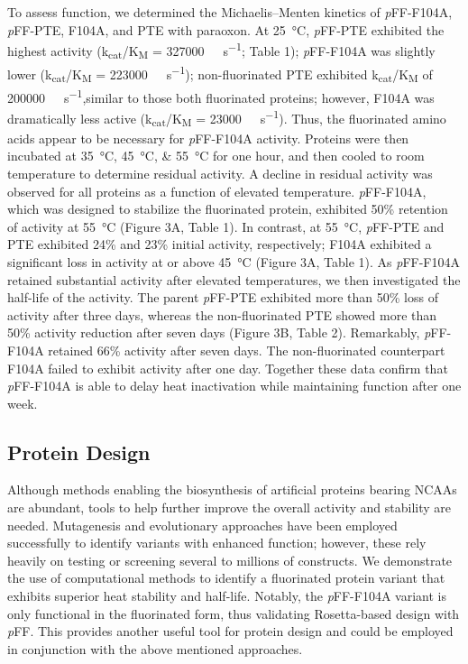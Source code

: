 \begin{refsection}
To assess function, we determined the Michaelis–Menten kinetics of
\emph{p}FF-F104A, \emph{p}FF-PTE, F104A, and PTE with paraoxon. At
\SI{25}{\celsius}, \emph{p}FF-PTE exhibited the highest activity
(k\textsubscript{cat}/K\textsubscript{M} = \SI{327000}{\per\Molar\per\second};
Table 1); \emph{p}FF-F104A was slightly lower
(k\textsubscript{cat}/K\textsubscript{M} = \SI{223000}{\per\Molar\per\second});
non-fluorinated PTE exhibited k\textsubscript{cat}/K\textsubscript{M} of
\SI{200000}{\per\Molar\per\second},similar to those both fluorinated proteins;
however, F104A was dramatically less active
(k\textsubscript{cat}/K\textsubscript{M} = \SI{23000}{\per\Molar\per\second}).
Thus, the fluorinated amino acids appear to be necessary for \emph{p}FF-F104A
activity.  Proteins were then incubated at \SIlist{35;45;55}{\celsius} for one
hour, and then cooled to room temperature to determine residual activity. A
decline in residual activity was observed for all proteins as a function of
elevated temperature. \emph{p}FF-F104A, which was designed to stabilize the
fluorinated protein, exhibited 50\% retention of activity at \SI{55}{\celsius}
(Figure 3A, Table 1). In contrast, at \SI{55}{\celsius}, \emph{p}FF-PTE and PTE
exhibited 24\% and 23\% initial activity, respectively; F104A exhibited a
significant loss in activity at or above \SI{45}{\celsius} (Figure 3A, Table
1). As \emph{p}FF-F104A retained substantial activity after elevated
temperatures, we then investigated the half-life of the activity. The parent
\emph{p}FF-PTE exhibited more than 50\% loss of activity after three days,
whereas the non-fluorinated PTE showed more than 50\% activity reduction after
seven days (Figure 3B, Table 2). Remarkably, \emph{p}FF-F104A retained 66\%
activity after seven days. The non-fluorinated counterpart F104A failed to
exhibit activity after one day. Together these data confirm that
\emph{p}FF-F104A is able to delay heat inactivation while maintaining function
after one week.

\subsection{Protein Design}

Although methods enabling the biosynthesis of artificial proteins bearing NCAAs
are abundant,\cite{Voloshchuk2009} tools to help further improve the overall
activity and stability are needed. Mutagenesis and evolutionary approaches have
been employed successfully to identify variants with enhanced function;
however, these rely heavily on testing or screening several to millions of
constructs.\cite{Voloshchuk2007b,Montclare2006b,Yoo2007} We demonstrate the use
of computational methods to identify a fluorinated protein variant that
exhibits superior heat stability and half-life. Notably, the \emph{p}FF-F104A
variant is only functional in the fluorinated form, thus validating
Rosetta-based design with \emph{p}FF. This provides another useful tool for
protein design and could be employed in conjunction with the above mentioned
approaches.

\printbibliography[heading=subbibliography]

\end{refsection}
